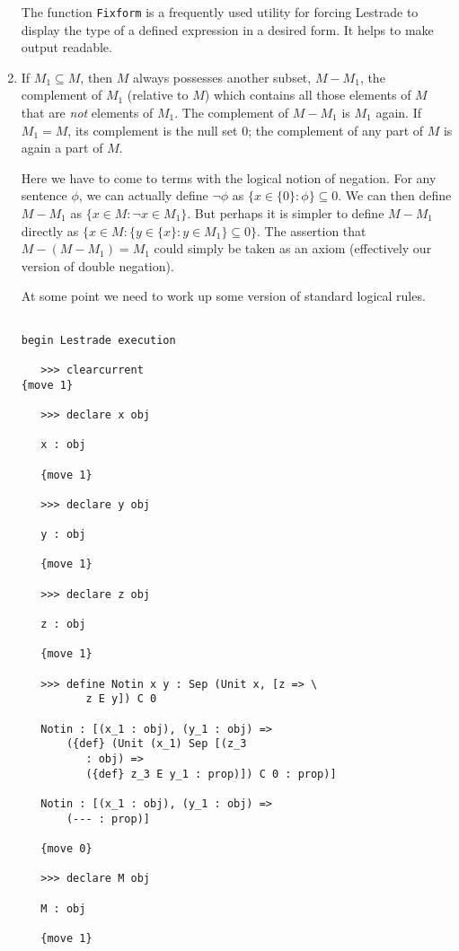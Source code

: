 \documentclass[12pt]{article}
\begin{document}
\begin{enumerate}
The function {\tt Fixform} is a frequently used utility for forcing Lestrade to display the type of a defined expression in a desired form.  It helps to make output readable.

\item  If $M_1 \subseteq M$, then $M$ always possesses another subset, $M - M_1$, the complement of $M_1$ (relative to $M$) which contains all those elements of $M$ that are {\em not\/} elements of $M_1$.  The complement of $M-M_1$ is
$M_1$ again.  If $M_1=M$, its complement is the null set 0;  the complement of any part of $M$ is again a part of $M$.

Here we have to come to terms with the logical notion of negation.  For any sentence $\phi$, we can actually define
$\neg \phi$ as $\{x \in \{0\}:\phi\} \subseteq 0$.  We can then define $M-M_1$ as $\{x \in M:\neg x \in M_1\}$.  But perhaps it is simpler to define $M-M_1$ directly as $\{x \in M:\{y \in \{x\}:y \in M_1\}\subseteq 0\}$.  The assertion that $M - (M-M_1) = M_1$ could simply be taken as an axiom (effectively our version of double negation).

At some point we need to work up some version of standard logical rules.

\begin{verbatim}

begin Lestrade execution

   >>> clearcurrent
{move 1}

   >>> declare x obj

   x : obj

   {move 1}

   >>> declare y obj

   y : obj

   {move 1}

   >>> declare z obj

   z : obj

   {move 1}

   >>> define Notin x y : Sep (Unit x, [z => \
          z E y]) C 0

   Notin : [(x_1 : obj), (y_1 : obj) => 
       ({def} (Unit (x_1) Sep [(z_3 
          : obj) => 
          ({def} z_3 E y_1 : prop)]) C 0 : prop)]

   Notin : [(x_1 : obj), (y_1 : obj) => 
       (--- : prop)]

   {move 0}

   >>> declare M obj

   M : obj

   {move 1}


\end{verbatim}
\end{enumerate}
\end{document}
